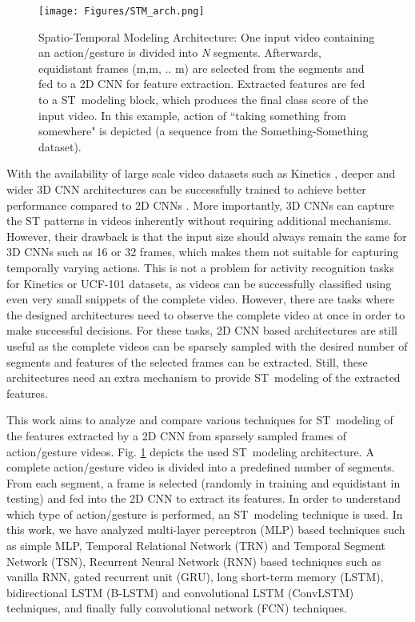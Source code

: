\documentclass[runningheads]{llncs}
\begin{document}
\begin{figure}[t!]
	\centering
	\texttt{[image: Figures/STM\_arch.png]}
	\caption{Spatio-Temporal Modeling Architecture: One input video containing an action/gesture is divided into \textit{N} segments. Afterwards, equidistant frames (m,m, .. m) are selected from the segments and fed to a 2D CNN for feature extraction. Extracted features are fed to a ST~modeling block, which produces the final class score of the input video. In this example, action of ``taking something from somewhere" is depicted (a sequence from the Something-Something dataset).}
	\label{fig:STM_arch}
	\vspace{-0.3cm}
\end{figure}


With the availability of large scale video datasets such as Kinetics \cite{carreira2017quo}, deeper and wider 3D CNN architectures can be successfully trained to achieve better performance compared to 2D CNNs \cite{hara2018can}. More importantly, 3D CNNs can capture the ST patterns in videos inherently without requiring additional mechanisms. However, their drawback is that the input size should always remain the same for 3D CNNs such as 16 or 32 frames, which makes them not suitable for capturing temporally varying actions. This is not a problem for activity recognition tasks for Kinetics \cite{carreira2017quo} or UCF-101 \cite{soomro2012ucf101} datasets, as videos can be successfully classified using even very small snippets of the complete video. However, there are tasks where the designed architectures need to observe the complete video at once in order to make successful decisions. For these tasks, 2D CNN based architectures are still useful as the complete videos can be sparsely sampled with the desired number of segments and features of the selected frames can be extracted. Still, these architectures need an extra mechanism to provide ST~modeling of the extracted features. 

This work aims to analyze and compare various techniques for ST~modeling of the features extracted by a 2D CNN from sparsely sampled frames of action/gesture videos. Fig. \ref{fig:STM_arch} depicts the used ST~modeling architecture. A complete action/gesture video is divided into a predefined number of segments. From each segment, a frame is selected (randomly in training and equidistant in testing) and fed into the 2D CNN to extract its features. In order to understand which type of action/gesture is performed, an ST~modeling technique is used. In this work, we have analyzed multi-layer perceptron (MLP) based techniques such as simple MLP, Temporal Relational Network (TRN) and Temporal Segment Network (TSN), Recurrent Neural Network (RNN) based techniques such as vanilla RNN, gated recurrent unit (GRU), long short-term memory (LSTM),  bidirectional LSTM (B-LSTM) and convolutional LSTM (ConvLSTM) techniques, and finally fully convolutional network (FCN) techniques.
\end{document}
